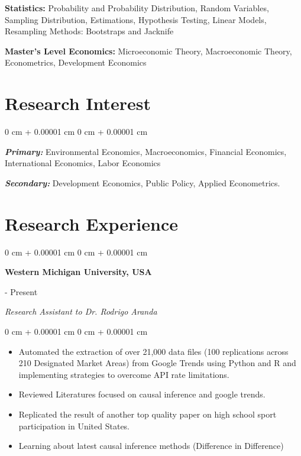 \documentclass[10pt, letterpaper]{article}
\newenvironment{onecolentry}{
    \begin{adjustwidth}{
        0 cm + 0.00001 cm
    }{
        0 cm + 0.00001 cm
    }
}{
    \end{adjustwidth}
} %
\newenvironment{twocolentry}[2][]{
    \onecolentry
    \def\secondColumn{#2}
    \setcolumnwidth{\fill, 4.5 cm}
    \begin{paracol}{2}
}{
    \switchcolumn \raggedleft \secondColumn
    \end{paracol}
    \endonecolentry
} %
\begin{document}
     \textbf{Statistics:} Probability and Probability Distribution, Random Variables, Sampling Distribution, Estimations, Hypothesis Testing, Linear Models, Resampling Methods: Bootstraps and Jacknife   \newline
         
    \textbf{Master's Level Economics:} Microeconomic Theory, Macroeconomic Theory, Econometrics, Development Economics
    
    \section{Research Interest}

    \begin{onecolentry}
       \textit{\textbf{Primary:}} Environmental Economics, Macroeconomics, Financial Economics, International Economics, Labor Economics

       \vspace{0.3cm}

   \textit{\textbf{Secondary:}} Development Economics, Public Policy, Applied Econometrics.  
              \end{onecolentry}

    \section{Research Experience}

\begin{twocolentry}{
2025 - Present
}
    \textbf{Western Michigan University, USA}    
\end{twocolentry}
    \textit{Research Assistant to Dr. Rodrigo Aranda}
    \begin{onecolentry}
            \begin{itemize}
\item Automated the extraction of over 21,000 data files (100 replications across 210 Designated Market Areas) from Google Trends using Python and R and implementing strategies to overcome API rate limitations. 
       \item  Reviewed Literatures focused on causal inference and google trends.
       \item Replicated the result of another top quality paper on high school sport participation in United States. 
       \item Learning about latest causal inference methods (Difference in Difference)

   \end{itemize}
   \end{onecolentry}
   
\end{document}
